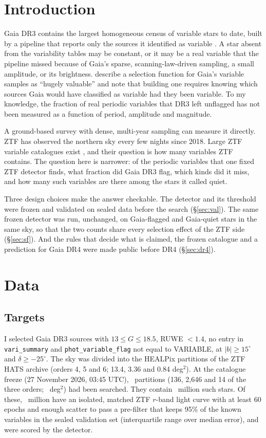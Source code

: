 \documentclass[twocolumn]{searchchev_preprint}
\begin{document}
\section{Introduction}
Gaia \citep{Gaia2016} DR3 \citep{Gaia2023} contains the largest homogeneous census of variable stars to date, built
by a pipeline that reports only the sources it identified as variable \citep{Eyer2023,Rimoldini2023}. A star absent
from the variability tables may be constant, or it may be a real variable that the pipeline missed because of Gaia's
sparse, scanning-law-driven sampling, a small amplitude, or its brightness. \citet{Everall2022} describe a selection
function for Gaia's variable samples as ``hugely valuable'' and note that building one requires knowing which sources
Gaia would have classified as variable had they been variable. To my knowledge, the fraction of real periodic
variables that DR3 left unflagged has not been measured as a function of period, amplitude and magnitude.

A ground-based survey with dense, multi-year sampling can measure it directly. ZTF \citep{Bellm2019,Masci2019} has
observed the northern sky every few nights since 2018. Large ZTF variable catalogues exist
\citep{Chen2020,Ofek2020,Healy2024}, and their question is how many variables ZTF contains. The question here is
narrower: of the periodic variables that one fixed ZTF detector finds, what fraction did Gaia DR3 flag, which kinds
did it miss, and how many such variables are there among the stars it called quiet.

Three design choices make the answer checkable. The detector and its threshold were frozen and validated on sealed
data before the search (\S\ref{sec:val}). The same frozen detector was run, unchanged, on Gaia-flagged and Gaia-quiet
stars in the same sky, so that the two counts share every selection effect of the ZTF side (\S\ref{sec:sf}). And the
rules that decide what is claimed, the frozen catalogue and a prediction for Gaia DR4 were made public before DR4
(\S\ref{sec:dr4}).

\section{Data}
\subsection{Targets}
I selected Gaia DR3 sources with $13\le G\le18.5$, RUWE $<1.4$, no entry in \texttt{vari\_summary} and
\texttt{phot\_variable\_flag} not equal to VARIABLE, at $|b|\ge15^\circ$ and $\delta\ge-25^\circ$. The sky was divided
into the HEALPix partitions of the ZTF HATS archive (orders 4, 5 and 6; 13.4, 3.36 and 0.84 deg$^2$). At the
catalogue freeze (27 November 2026, 03:45 UTC), \ntiles\ partitions (136, 2,646 and 14 of the three orders;
\narea\ deg$^2$) had been searched. They contain \nquietM\ million such stars. Of these, \nscoredM\ million have an
isolated, matched ZTF $r$-band light curve with at least 60 epochs and enough scatter to pass a pre-filter that keeps
95\% of the known variables in the sealed validation set (interquartile range over median error), and were scored by
the detector.
\end{document}

